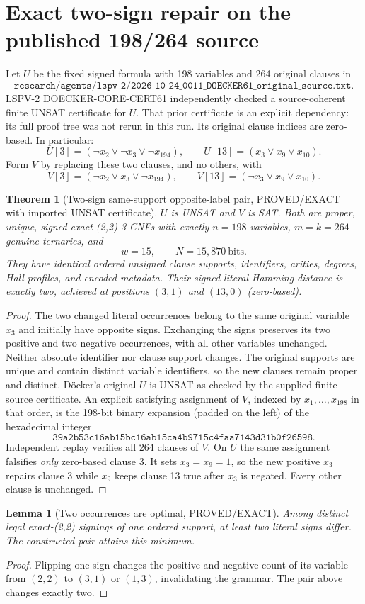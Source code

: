 \documentclass[11pt]{article}
\newtheorem{theorem}{Theorem}
\newtheorem{lemma}{Lemma}
\begin{document}
\section{Exact two-sign repair on the published 198/264 source}
Let $U$ be the fixed signed formula with 198 variables and 264 original clauses in
\[
\texttt{research/agents/lspv-2/2026-10-24\_0011\_DOECKER61\_original\_source.txt}.
\]
LSPV-2 DOECKER-CORE-CERT61 independently checked a source-coherent finite UNSAT certificate for $U$. That prior certificate is an explicit dependency: its full proof tree was not rerun in this run. Its original clause indices are zero-based. In particular:
\[
U[3]=(\neg x_2\vee\neg x_3\vee\neg x_{194}),\qquad
U[13]=(x_3\vee x_9\vee x_{10}).
\]
Form $V$ by replacing these two clauses, and no others, with
\[
V[3]=(\neg x_2\vee x_3\vee\neg x_{194}),\qquad
V[13]=(\neg x_3\vee x_9\vee x_{10}).
\]
\begin{theorem}[Two-sign same-support opposite-label pair, PROVED/EXACT with imported UNSAT certificate]
$U$ is UNSAT and $V$ is SAT. Both are proper, unique, signed exact-(2,2) 3-CNFs with exactly $n=198$ variables, $m=k=264$ genuine ternaries, and
\[
w=15,\qquad N=15{,}870\ \mathrm{bits}.
\]
They have identical \emph{ordered unsigned clause supports}, identifiers, arities, degrees, Hall profiles, and encoded metadata. Their signed-literal Hamming distance is exactly two, achieved at positions $(3,1)$ and $(13,0)$ (zero-based).
\end{theorem}
\begin{proof}
The two changed literal occurrences belong to the same original variable $x_3$ and initially have opposite signs. Exchanging the signs preserves its two positive and two negative occurrences, with all other variables unchanged. Neither absolute identifier nor clause support changes. The original supports are unique and contain distinct variable identifiers, so the new clauses remain proper and distinct. D\"ocker's original $U$ is UNSAT as checked by the supplied finite-source certificate. An explicit satisfying assignment of $V$, indexed by $x_1,\ldots,x_{198}$ in that order, is the 198-bit binary expansion (padded on the left) of the hexadecimal integer
\[
\texttt{39a2b53c16ab15bc16ab15ca4b9715c4faa7143d31b0f26598}.
\]
Independent replay verifies all 264 clauses of $V$. On $U$ the same assignment falsifies \emph{only} zero-based clause 3. It sets $x_3=x_9=1$, so the new positive $x_3$ repairs clause 3 while $x_9$ keeps clause 13 true after $x_3$ is negated. Every other clause is unchanged.
\end{proof}
\begin{lemma}[Two occurrences are optimal, PROVED/EXACT]
Among \emph{distinct} legal exact-(2,2) signings of one ordered support, at least two literal signs differ. The constructed pair attains this minimum.
\end{lemma}
\begin{proof}
Flipping one sign changes the positive and negative count of its variable from $(2,2)$ to $(3,1)$ or $(1,3)$, invalidating the grammar. The pair above changes exactly two.
\end{proof}
\end{document}
